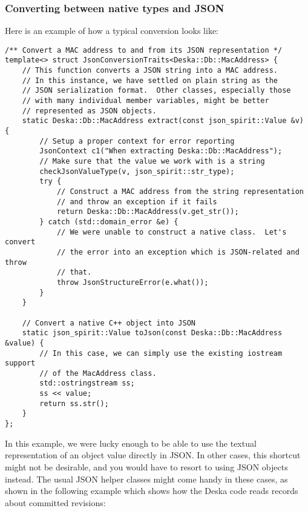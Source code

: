 \documentclass[deska]{subfiles}
\begin{document}
\subsubsection{Converting between native types and JSON}

Here is an example of how a typical conversion looks like:

\begin{verbatim}
/** Convert a MAC address to and from its JSON representation */
template<> struct JsonConversionTraits<Deska::Db::MacAddress> {
    // This function converts a JSON string into a MAC address.
    // In this instance, we have settled on plain string as the
    // JSON serialization format.  Other classes, especially those
    // with many individual member variables, might be better
    // represented as JSON objects.
    static Deska::Db::MacAddress extract(const json_spirit::Value &v) {
        // Setup a proper context for error reporting
        JsonContext c1("When extracting Deska::Db::MacAddress");
        // Make sure that the value we work with is a string
        checkJsonValueType(v, json_spirit::str_type);
        try {
            // Construct a MAC address from the string representation
            // and throw an exception if it fails
            return Deska::Db::MacAddress(v.get_str());
        } catch (std::domain_error &e) {
            // We were unable to construct a native class.  Let's convert
            // the error into an exception which is JSON-related and throw
            // that.
            throw JsonStructureError(e.what());
        }
    }

    // Convert a native C++ object into JSON
    static json_spirit::Value toJson(const Deska::Db::MacAddress &value) {
        // In this case, we can simply use the existing iostream support
        // of the MacAddress class.
        std::ostringstream ss;
        ss << value;
        return ss.str();
    }
};
\end{verbatim}

In this example, we were lucky enough to be able to use the textual representation of an object value directly in JSON.
In other cases, this shortcut might not be desirable, and you would have to resort to using JSON objects instead.  The
usual JSON helper classes might come handy in these cases, as shown in the following example which shows how the Deska
code reads records about committed revisions:
\end{document}
